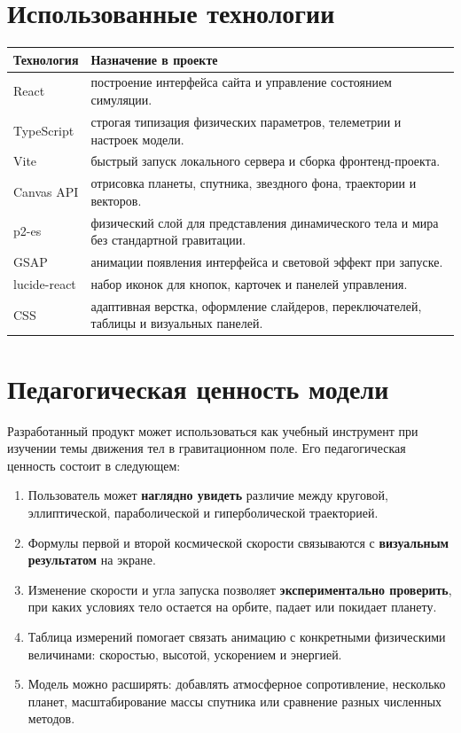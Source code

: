 \documentclass[12pt,a4paper]{article}
\begin{document}
\section{Использованные технологии}
\begin{longtable}{p{}p{}}
\toprule
\textbf{Технология} & \textbf{Назначение в проекте}\\
\midrule
React & построение интерфейса сайта и управление состоянием симуляции.\\
TypeScript & строгая типизация физических параметров, телеметрии и настроек модели.\\
Vite & быстрый запуск локального сервера и сборка фронтенд-проекта.\\
Canvas API & отрисовка планеты, спутника, звездного фона, траектории и векторов.\\
p2-es & физический слой для представления динамического тела и мира без стандартной гравитации.\\
GSAP & анимации появления интерфейса и световой эффект при запуске.\\
lucide-react & набор иконок для кнопок, карточек и панелей управления.\\
CSS & адаптивная верстка, оформление слайдеров, переключателей, таблицы и визуальных панелей.\\
\bottomrule
\end{longtable}

\section{Педагогическая ценность модели}
Разработанный продукт может использоваться как учебный инструмент при изучении темы движения тел в гравитационном поле. Его педагогическая ценность состоит в следующем:
\begin{enumerate}
    \item Пользователь может \textbf{наглядно увидеть} различие между круговой, эллиптической, параболической и гиперболической траекторией.
    \item Формулы первой и второй космической скорости связываются с \textbf{визуальным результатом} на экране.
    \item Изменение скорости и угла запуска позволяет \textbf{экспериментально проверить}, при каких условиях тело остается на орбите, падает или покидает планету.
    \item Таблица измерений помогает связать анимацию с конкретными физическими величинами: скоростью, высотой, ускорением и энергией.
    \item Модель можно расширять: добавлять атмосферное сопротивление, несколько планет, масштабирование массы спутника или сравнение разных численных методов.
\end{enumerate}
\end{document}
